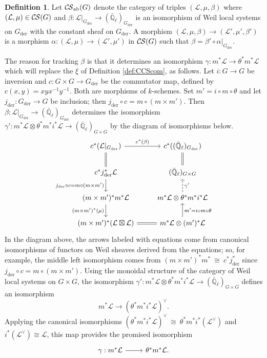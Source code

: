 \documentclass[10pt]{amsart}
\theoremstyle{plain}
\theoremstyle{definition}
\newtheorem{definition}[theorem]{Definition}
\newcommand{\EE}{\mathbb{\bar Q}_\ell}
\newcommand{\Fq}{k}
\newcommand{\der}{_{\operatorname{der}}}
\newcommand{\ab}{_{\operatorname{ab}}}
\newcommand{\iso}{{\ \cong\ }}
\newcommand{\cs}[1]{{\mathcal{#1}}}
\newcommand{\CS}{{\mathcal{C\hskip-0.8pt S}}}
\begin{document}
\begin{definition}\label{def:CSab}
Let $\CS\ab(G)$ denote the category of triples $(\cs{L},\mu,\beta)$ where $(\cs{L},\mu) \in \CS(G)$ and
$\beta : \cs{L}\vert_{G\der} \to (\EE)_{G\der}$ is an isomorphism of Weil local systems on $G\der$ with the constant sheaf on $G\der$.
A morphism $(\cs{L},\mu,\beta)\to (\cs{L}',\mu',\beta')$ is a morphism $\alpha : (\cs{L},\mu)\to (\cs{L}',\mu')$
in $\CS(G)$ such that $\beta = \beta' \circ \alpha\vert_{G\der}$.  
\end{definition}

The reason for tracking $\beta$ is that it determines an isomorphism $\gamma : m^*\cs{L} \to \theta^*m^*\cs{L}$ which will replace the $\xi$ of Definition \ref{def:CCScom}, as follows.
Let $i : G \to G$ be inversion and $c : G\times G\to G\der$ be the commutator map, defined by $c(x,y)= xyx^{-1}y^{-1}$.
Both are morphisms of $\Fq$-schemes.
Set $m' = i \circ m \circ \theta$ and let $j\der : G\der\to G$ be inclusion; then $j\der\circ c = m \circ (m \times m')$.
Then $\beta : \cs{L}\vert_{G\der} \to (\EE)_{G\der}$ determines the isomorphism $\gamma' : m^*\cs{L} \otimes \theta^* m^* i^*\cs{L} \to (\EE)_{G\times G}$ by the diagram of isomorphisms below.
\begin{equation}
\begin{tikzcd}
\arrow[equal]{d} c^* (\cs{L}\vert_{G\der}) \arrow{r}{c^*(\beta)} 
	&  c^*((\EE)_{G\der}) \arrow[equal]{d} \\
\arrow{d}[swap]{j\der\circ c = m \circ (m \times m')} c^* j\der^* \cs{L} 
	&   (\EE)_{G\times G} \\
(m \times m')^* m^* \cs{L} \arrow{d}[swap]{(m \times m')^*(\mu)} 
	&  m^*\cs{L} \otimes \theta^* m^* i^* \cs{L}  \arrow[dashed]{u}[swap]{\gamma'} \\
(m \times m')^* (\cs{L} \boxtimes \cs{L}) \arrow[equal]{r} 
	& m^*\cs{L} \otimes (m')^*\cs{L} \arrow{u}[swap]{m' = i\circ m\circ \theta} 
\end{tikzcd}
\end{equation}
In the diagram above, the arrows labeled with equations come from canonical isomorphisms of functors on Weil sheaves derived from the equations; so, for example, the middle left isomorphism comes from $(m\times m')^* m^* \iso c^* j\der^*$ since $j\der\circ c = m \circ (m \times m')$.
Using the monoidal structure of the category of Weil local systems on $G\times G$, the isomorphism $\gamma' : m^*\cs{L} \otimes \theta^* m^* i^*\cs{L} \to (\EE)_{G\times G}$ defines an isomorphism
\[
m^*\cs{L} \to (\theta^* m^* i^*\cs{L})^\vee.
\]
Applying the canonical isomorphisms $(\theta^* m^* i^*\cs{L})^\vee \iso \theta^* m^* i^* (\cs{L}^\vee)$ and $i^*(\cs{L}^\vee) \cong \cs{L}$, this map provides the promised isomorphism
\[
\begin{tikzcd}
\gamma : m^*\cs{L} \arrow{r} & \theta^* m^* \cs{L}.
\end{tikzcd}
\]
\end{document}
